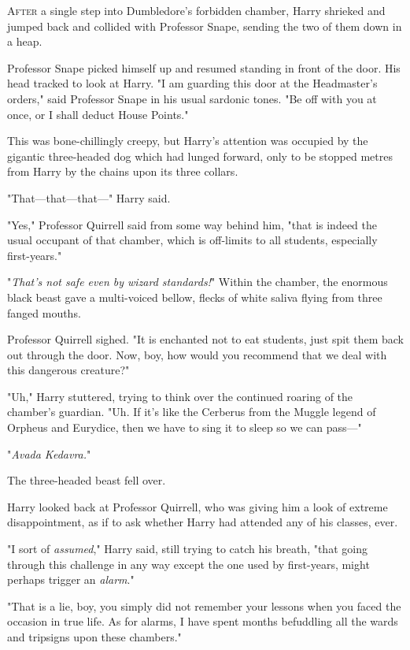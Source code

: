 
\lettrine{A}{fter} a single
step into Dumbledore's forbidden chamber, Harry shrieked and jumped back and
collided with Professor Snape, sending the two of them down in a heap.

Professor Snape picked himself up and resumed standing in front of the door.
His head tracked to look at Harry. "I am guarding this door at the Headmaster's
orders," said Professor Snape in his usual sardonic tones. "Be off with you at
once, or I shall deduct House Points."

This was bone-chillingly creepy, but Harry's attention was occupied by the
gigantic three-headed dog which had lunged forward, only to be stopped metres
from Harry by the chains upon its three collars.

"That---that---that---" Harry said.

"Yes," Professor Quirrell said from some way behind him, "that is indeed the
usual occupant of that chamber, which is off-limits to all students, especially
first-years."

"\emph{That's not safe even by wizard standards!}" Within the chamber, the
enormous black beast gave a multi-voiced bellow, flecks of white saliva flying
from three fanged mouths.

Professor Quirrell sighed. "It is enchanted not to eat students, just spit them
back out through the door. Now, boy, how would you recommend that we deal with
this dangerous creature?"

"Uh," Harry stuttered, trying to think over the continued roaring of the
chamber's guardian. "Uh. If it's like the Cerberus from the Muggle legend of
Orpheus and Eurydice, then we have to sing it to sleep so we can pass---"

"\emph{Avada Kedavra.}"

The three-headed beast fell over.

Harry looked back at Professor Quirrell, who was giving him a look of extreme
disappointment, as if to ask whether Harry had attended any of his classes,
ever.

"I sort of \emph{assumed}," Harry said, still trying to catch his breath, "that
going through this challenge in any way except the one used by first-years,
might perhaps trigger an \emph{alarm}."

"That is a lie, boy, you simply did not remember your lessons when you faced
the occasion in true life. As for alarms, I have spent months befuddling all
the wards and tripsigns upon these chambers."

